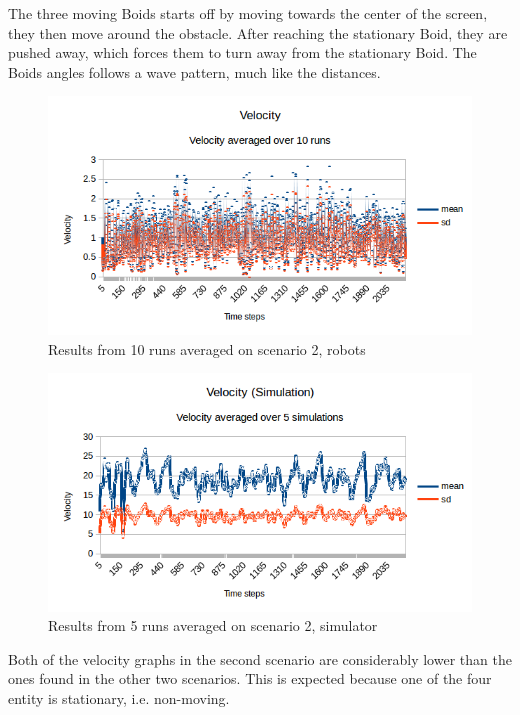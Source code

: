 The three moving Boids starts off by moving towards the center of the screen, they then move around the obstacle. After reaching the stationary Boid, they are pushed away, which forces them to turn away from the stationary Boid. The Boids angles follows a wave pattern, much like the distances.

\begin{figure}[h]
\begin{center}
\includegraphics[width=0.8\linewidth]{figs/runs/2pvel}
\end{center}
\caption[2. Velocity, robots]{Results from 10 runs averaged on scenario 2, robots}
\label{fig:res2pvel}
\end{figure}
\begin{figure}[h]
\begin{center}
\includegraphics[width=0.8\linewidth]{figs/runs/2svel}
\end{center}
\caption[2. Velocity, robots]{Results from 5 runs averaged on scenario 2, simulator}
\label{fig:res2svel}
\end{figure}
Both of the velocity graphs in the second scenario are considerably lower than the ones found in the other two scenarios. This is expected because one of the four entity is stationary, i.e. non-moving. 
\clearpage
